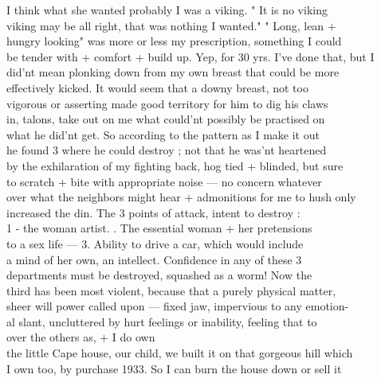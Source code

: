 \documentclass[11pt,a4paper]{article}
\begin{document}
{I think what she wanted \struck{+} probably I was a viking. " It is no viking \\
viking may be all right, that was nothing I wanted." " Long, lean + \\
hungry looking" was more or less my prescription, something I could \\
be tender with + comfort + build up. Yep, for 30 yrs. I've done that, but I \\
did'nt mean plonking down from my own breast that could be more \\
effectively kicked. It would seem that a downy breast, not too \\
vigorous or asserting made good territory for him to dig his claws \\
in, talons, take out on me what could'nt possibly be practised on \\
\struck{\ill{}} what he did'nt get. So according to the pattern as I make it out \\
he found 3  where he could destroy ; not that he was'nt heartened \\
by the exhilaration of my fighting back, hog tied + blinded, but sure \\
to scratch + bite with appropriate noise --- no concern whatever \\
over what the neighbors might hear + admonitions for me to hush only \\
increased the din. The 3 points of attack, intent to destroy : \\
1 - the woman artist. . The essential woman + her pretensions \\
to a sex life --- \struck{\ill{}} 3. Ability to drive a car, which would include \\
a mind of her own, an intellect. Confidence in any of these 3 \\
departments must be destroyed, squashed as a worm! Now the \\
third has been most violent, because that a purely physical matter, \\
sheer will power called upon --- fixed jaw, impervious to any emotion- \\
al slant, uncluttered by hurt feelings or inability, feeling that to \\
 over the others as,  + I do own \\
the little Cape house, our child, we built it on that gorgeous hill which \\
I own too, by purchase 1933. So I can burn the house down or sell it}
\end{document}
